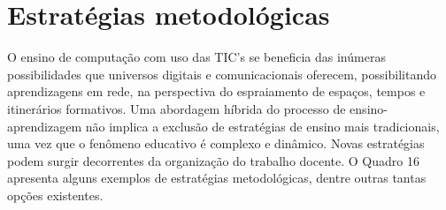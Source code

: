 \documentclass[
	12pt,				%
	openright,			%
  oneside,     %
	a4paper,			%
	chapter=TITLE,		%
	english,			%
	french,				%
	spanish,			%
	brazil				%
	]{abntex2}
\begin{document}
\section{Estratégias metodológicas}

O ensino de computação com uso das TIC's se beneficia das inúmeras possibilidades que universos digitais e comunicacionais oferecem, possibilitando aprendizagens em rede, na perspectiva do espraiamento de espaços, tempos e itinerários formativos. Uma abordagem híbrida do processo de ensino-aprendizagem não implica a exclusão de estratégias de ensino mais tradicionais, uma vez que o fenômeno educativo é complexo e dinâmico. Novas estratégias podem surgir decorrentes da organização do trabalho docente. O Quadro 16 apresenta alguns exemplos de estratégias metodológicas, dentre outras tantas opções existentes.
\end{document}
